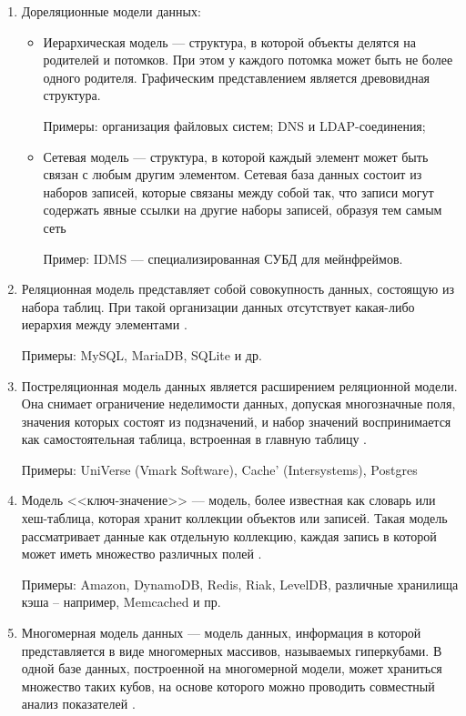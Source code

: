 \begin{enumerate}
	\item Дореляционные модели данных:
	\begin{itemize}
		\item Иерархическая модель --- структура, в которой объекты делятся на родителей и потомков. При этом у каждого потомка может быть не более одного родителя. Графическим представлением является древовидная структура.
		
		Примеры: организация файловых систем; DNS и LDAP-соединения;
		
		\item Сетевая модель --- структура, в которой каждый элемент может быть связан с любым другим элементом. Сетевая база данных состоит из наборов записей, которые связаны между собой так, что записи могут содержать явные ссылки на другие наборы записей, образуя тем самым сеть \cite{models}
		
		Пример: IDMS --- специализированная СУБД для мейнфреймов.
	\end{itemize}
	
	\item Реляционная модель представляет собой совокупность данных, состоящую из набора таблиц. При такой организации данных отсутствует какая-либо иерархия между элементами \cite{rel}.
	
	Примеры: MySQL, MariaDB, SQLite и др. 
	
	\item Постреляционная модель данных является расширением реляционной модели. Она снимает ограничение неделимости данных, допуская многозначные поля, значения которых состоят из подзначений, и набор значений воспринимается как самостоятельная таблица, встроенная в главную таблицу \cite{post}.
	
	Примеры:  UniVerse (Vmark Software), Cache’ (Intersystems), Postgres
	
	\item Модель <<ключ-значение>> --- модель, более известная как словарь или хеш-таблица, которая хранит коллекции объектов или записей. Такая модель рассматривает данные как отдельную коллекцию, каждая запись в которой может иметь множество различных полей \cite{key-value}.
	
	Примеры: Amazon, DynamoDB, Redis, Riak, LevelDB, различные хранилища кэша – например, Memcached и пр.
	
	\item Многомерная модель данных --- модель данных, информация в которой представляется в виде многомерных массивов, называемых гиперкубами. В одной базе данных, построенной на многомерной модели, может храниться множество таких кубов, на основе которого можно проводить совместный анализ показателей \cite{post}.
	

\end{enumerate}
